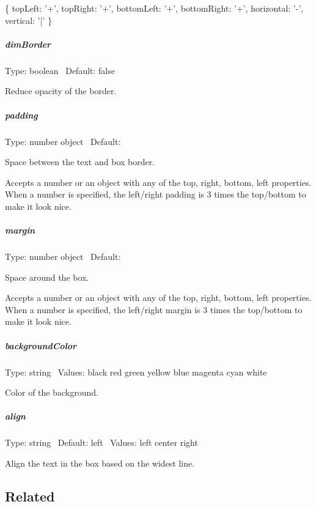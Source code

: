 \begin{DoxyCode}
\{
    topLeft: '+',
    topRight: '+',
    bottomLeft: '+',
    bottomRight: '+',
    horizontal: '-',
    vertical: '|'
\}
\end{DoxyCode}


\subparagraph*{dim\+Border}

Type\+: {\ttfamily boolean}~\newline
 Default\+: {\ttfamily false}

Reduce opacity of the border.

\subparagraph*{padding}

Type\+: {\ttfamily number} {\ttfamily object}~\newline
 Default\+: {}

Space between the text and box border.

Accepts a number or an object with any of the {\ttfamily top}, {\ttfamily right}, {\ttfamily bottom}, {\ttfamily left} properties. When a number is specified, the left/right padding is 3 times the top/bottom to make it look nice.

\subparagraph*{margin}

Type\+: {\ttfamily number} {\ttfamily object}~\newline
 Default\+: {}

Space around the box.

Accepts a number or an object with any of the {\ttfamily top}, {\ttfamily right}, {\ttfamily bottom}, {\ttfamily left} properties. When a number is specified, the left/right margin is 3 times the top/bottom to make it look nice.

\subparagraph*{background\+Color}

Type\+: {\ttfamily string}~\newline
 Values\+: {\ttfamily black} {\ttfamily red} {\ttfamily green} {\ttfamily yellow} {\ttfamily blue} {\ttfamily magenta} {\ttfamily cyan} {\ttfamily white}

Color of the background.

\subparagraph*{align}

Type\+: {\ttfamily string}~\newline
 Default\+: {\ttfamily left}~\newline
 Values\+: {\ttfamily left} {\ttfamily center} {\ttfamily right}

Align the text in the box based on the widest line.

\subsection*{Related}


